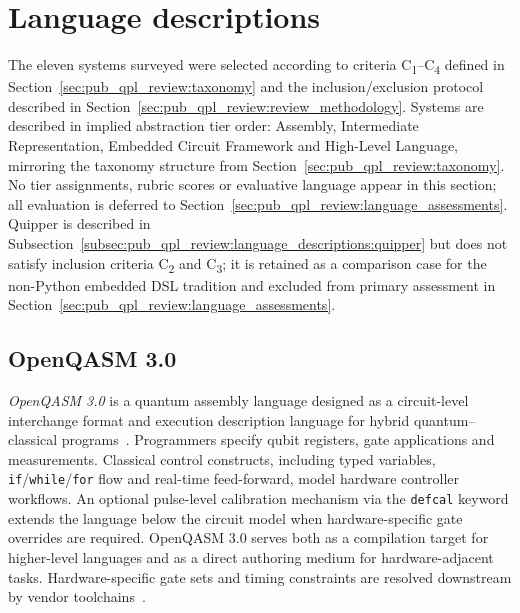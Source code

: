 \section{Language descriptions}\label{sec:pub_qpl_review:language_descriptions}
The eleven systems surveyed were selected according to criteria C\textsubscript{1}--C\textsubscript{4} defined in Section~\ref{sec:pub_qpl_review:taxonomy} and the inclusion/exclusion protocol described in Section~\ref{sec:pub_qpl_review:review_methodology}.
Systems are described in implied abstraction tier order: Assembly, Intermediate Representation, Embedded Circuit Framework and High-Level Language, mirroring the taxonomy structure from Section~\ref{sec:pub_qpl_review:taxonomy}.
No tier assignments, rubric scores or evaluative language appear in this section; all evaluation is deferred to Section~\ref{sec:pub_qpl_review:language_assessments}.
Quipper is described in Subsection~\ref{subsec:pub_qpl_review:language_descriptions:quipper} but does not satisfy inclusion criteria C\textsubscript{2} and C\textsubscript{3}; it is retained as a comparison case for the non-Python embedded DSL tradition and excluded from primary assessment in Section~\ref{sec:pub_qpl_review:language_assessments}.

\subsection{OpenQASM 3.0}\label{subsec:pub_qpl_review:language_descriptions:openqasm}
\textit{OpenQASM 3.0} is a quantum assembly language designed as a circuit-level interchange format and execution description language for hybrid quantum--classical programs~\cite{cross2022openqasm3}.
Programmers specify qubit registers, gate applications and measurements.
Classical control constructs, including typed variables, \texttt{if}/\texttt{while}/\texttt{for} flow and real-time feed-forward, model hardware controller workflows.
An optional pulse-level calibration mechanism via the \texttt{defcal} keyword extends the language below the circuit model when hardware-specific gate overrides are required.
OpenQASM 3.0 serves both as a compilation target for higher-level languages and as a direct authoring medium for hardware-adjacent tasks.
Hardware-specific gate sets and timing constraints are resolved downstream by vendor toolchains~\cite{cross2022openqasm3}.

